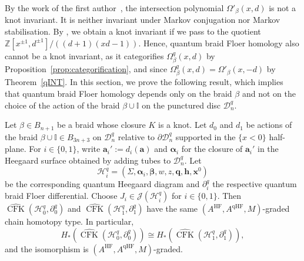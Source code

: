 \documentclass[11pt]{amsart}
\numberwithin{equation}{section}
\numberwithin{figure}{section}
\theoremstyle{definition}
\newcommand{\cD}{\mathcal{D}}
\newcommand{\cH}{\mathcal{H}}
\newcommand{\cJ}{\mathscr{J}}
\newcommand{\bI}{\mathbb{I}}
\newcommand{\bZ}{\mathbb{Z}}
\DeclareMathOperator{\qHF}{qHF}
\DeclareMathOperator{\CFK}{CFK}
\newcommand{\CFKh}{\widehat{\CFK}}
\DeclareMathOperator{\HF}{HF}
\newcommand{\as}{\boldsymbol{\alpha}}
\newcommand{\bs}{\boldsymbol{\beta}}
\newcommand{\ba}{\boldsymbol{a}}
\newcommand{\hs}{\boldsymbol{h}}
\newcommand{\qs}{\boldsymbol{q}}
\newcommand{\xs}{\boldsymbol{x}}
\begin{document}
By the work of the first author~\cite{Anghel2024AIF}, the intersection polynomial $\Omega'_\beta(x,d)$ is not a knot invariant. It is neither invariant under Markov conjugation nor Markov stabilisation. By \cite[Theorem~1.6]{Anghel2024AIF}, we obtain a knot invariant if we pass to the quotient $\bZ[x^{\pm 1}, d^{\pm 1}]/((d+1)(xd-1))$. Hence, quantum braid Floer homology also cannot be a knot invariant, as it categorifies $\Omega^q_\beta(x,d)$ by Proposition~\ref{prop:categorification}, and since $\Omega^q_\beta(x,d) = \Omega'_\beta(x,-d)$ by Theorem~\ref{qINT}. In this section, we prove the following result, which implies that quantum braid Floer homology depends only on the braid $\beta$ and not on the choice of the action of the braid $\beta \cup \bI$ on the punctured disc $\cD_n^q$.

\begin{thm}\label{thm:braid-invariance}
    Let $\beta \in B_{n+1}$ be a braid whose closure $K$ is a knot. Let $d_0$ and $d_1$ be actions of the braid $\beta \cup \bI \in B_{3n+3}$ on $\cD_n^q$ relative to $\partial \cD_n^q$ supported in the $\{x<0\}$ half-plane. For $i \in \{0,1\}$, write $\ba_i' := d_i(\ba)$ and $\as_i$ for the closure of $\ba_i'$ in the Heegaard surface obtained by adding tubes to $\cD_n^q$. Let
    \[
    \cH^q_i = (\Sigma,\as_i,\bs, w, z, \qs, \hs, \xs^0)
    \]
    be the corresponding quantum Heegaard diagram and $\partial^q_i$ the respective quantum braid Floer differential. Choose $J_i \in \cJ(\cH^q_i)$ for $i \in \{0,1\}$. Then $\CFKh(\cH^q_0, \partial^q_0)$ and $\CFKh(\cH^q_1, \partial^q_1)$ have the same $(A^{\HF}, A^{\qHF}, M)$-graded chain homotopy type. In particular, 
    \[
    H_*\left(\CFKh(\cH^q_0, \partial^q_0)\right) \cong H_*\left(\CFKh(\cH^q_1, \partial^q_1)\right),
    \]
    and the isomorphism is $(A^{\HF}, A^{\qHF}, M)$-graded. 
\end{thm}
\end{document}
